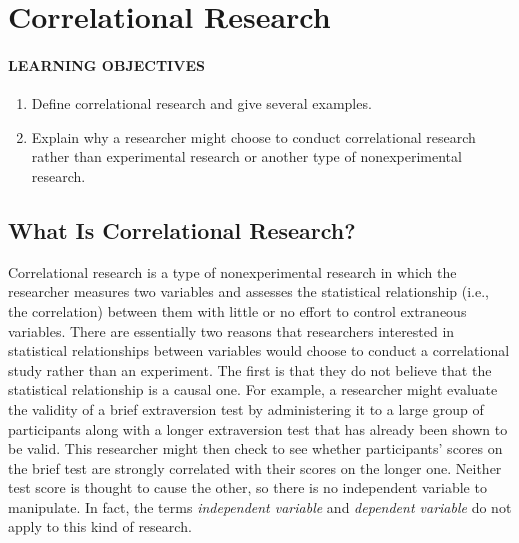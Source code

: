 \documentclass[
]{krantz}
\providecommand{\tightlist}{%
  \setlength{\itemsep}{0pt}\setlength{\parskip}{0pt}}
\begin{document}
\section{Correlational Research}\label{correlational-research}

\paragraph*{LEARNING OBJECTIVES}\label{learning-objectives-19}

\begin{enumerate}
\def\labelenumi{\arabic{enumi}.}
\tightlist
\item
  Define correlational research and give several examples.
\item
  Explain why a researcher might choose to conduct correlational research rather than experimental research or another type of nonexperimental research.
\end{enumerate}

\subsection*{What Is Correlational Research?}\label{what-is-correlational-research}


Correlational research is a type of nonexperimental research in which the researcher measures two variables and assesses the statistical relationship (i.e., the correlation) between them with little or no effort to control extraneous variables. There are essentially two reasons that researchers interested in statistical relationships between variables would choose to conduct a correlational study rather than an experiment. The first is that they do not believe that the statistical relationship is a causal one. For example, a researcher might evaluate the validity of a brief extraversion test by administering it to a large group of participants along with a longer extraversion test that has already been shown to be valid. This researcher might then check to see whether participants' scores on the brief test are strongly correlated with their scores on the longer one. Neither test score is thought to cause the other, so there is no independent variable to manipulate. In fact, the terms \emph{independent variable} and \emph{dependent variable} do not apply to this kind of research.
\end{document}
